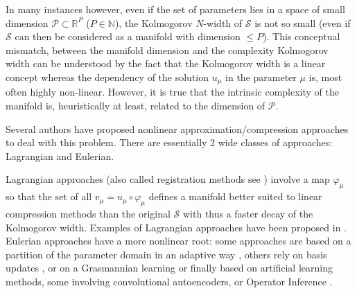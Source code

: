 \documentclass[graybox]{svmult}
\def\R{\mathbb{R}}
\def\N{\mathbb{N}}
\begin{document}
 In many instances however, even if the set of parameters lies in a space of small dimension ${\mathcal P} \subset \R^P$ ($P\in \N$),  the Kolmogorov $N$-width of ${\mathcal S}$ is not so small (even if ${\mathcal S}$ can then be considered as a manifold with dimension $\le P$). This conceptual mismatch, between the manifold dimension and the complexity Kolmogorov width can be understood by the fact that the Kolmogorov width is a linear concept whereas the dependency of the solution $u_\mu$ in the parameter $\mu$ is, most often highly non-linear. However, it is true that the intrinsic complexity of the manifold is, heuristically at least, related to the dimension of ${\mathcal P}$.  
 
 Several authors have proposed nonlinear approximation/compression approaches to deal with this problem. There are essentially 2 wide classes of approaches: Lagrangian and Eulerian. 

Lagrangian approaches (also called registration methods see \cite{Taddei2020}) involve a map $\varphi_\mu$ so that the set of all $v_\mu = u_\mu \circ \varphi_\mu$ defines a manifold better suited to linear compression methods than the original ${\mathcal S}$ with thus a faster decay of the  Kolmogorov width. Examples of Lagrangian approaches have been proposed in \cite{iollo2014, mojgani2017, cagniart2019, ohlberger2013, Taddei2015, ferrero2022}. Eulerian approaches have a more nonlinear root: some approaches are based on a partition of the parameter domain in an adaptive way \cite{eftang2011}, others rely on basis updates \cite{maday2013, carlberg2015, etter2019, peherstorfer2020}, or on a Grasmannian learning \cite{amsallem2008, zimmermann2018, polack2021} or finally based on artificial learning methods, some involving convolutional autoencoders, \cite{kashima2016, Youngkyu2020, Lee2020, Fresca2021} or Operator Inference \cite{Kramer2024}.
\end{document}
